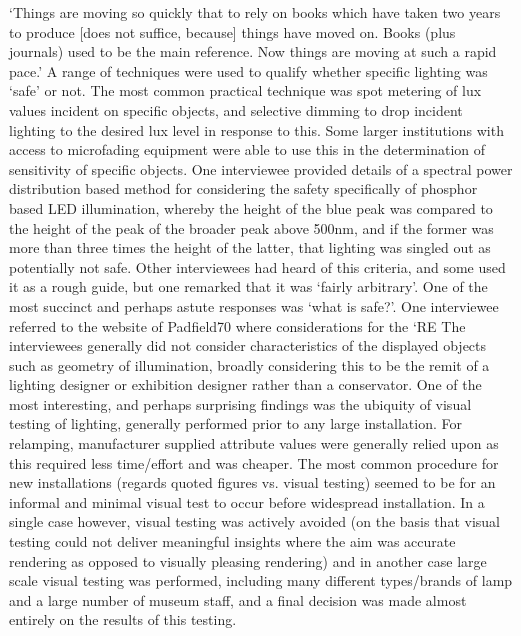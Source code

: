 `Things are moving so quickly that to rely on books which have taken two years to produce [does not suffice, because] things have moved on. Books (plus journals) used to be the main reference. Now things are moving at such a rapid pace.'
A range of techniques were used to qualify whether specific lighting was `safe' or not. The most common practical technique was spot metering of lux values incident on specific objects, and selective dimming to drop incident lighting to the desired lux level in response to this. Some larger institutions with access to microfading equipment were able to use this in the determination of sensitivity of specific objects. One interviewee provided details of a spectral power distribution based method for considering the safety specifically of phosphor based LED illumination, whereby the height of the blue peak was compared to the height of the peak of the broader peak above 500nm, and if the former was more than three times the height of the latter, that lighting was singled out as potentially not safe. Other interviewees had heard of this criteria, and some used it as a rough guide, but one remarked that it was `fairly arbitrary'. One of the most succinct and perhaps astute responses was `what is safe?'. One interviewee referred to the website of Padfield70 where considerations for the `RE%
The interviewees generally did not consider characteristics of the displayed objects such as geometry of illumination, broadly considering this to be the remit of a lighting designer or exhibition designer rather than a conservator.
One of the most interesting, and perhaps surprising findings was the ubiquity of visual testing of lighting, generally performed prior to any large installation. For relamping, manufacturer supplied attribute values were generally relied upon as this required less time/effort and was cheaper. The most common procedure for new installations (regards quoted figures vs. visual testing) seemed to be for an informal and minimal visual test to occur before widespread installation. In a single case however, visual testing was actively avoided (on the basis that visual testing could not deliver meaningful insights where the aim was accurate rendering as opposed to visually pleasing rendering) and in another case large scale visual testing was performed, including many different types/brands of lamp and a large number of museum staff, and a final decision was made almost entirely on the results of this testing.
